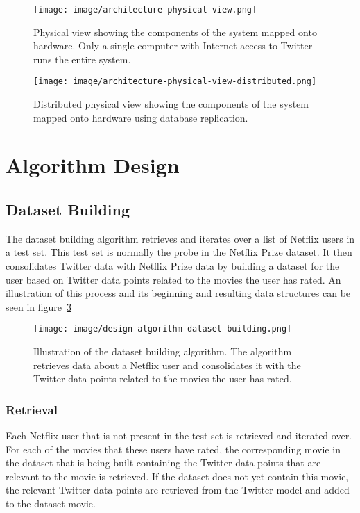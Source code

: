 \begin{figure}[H]
\centerline{\texttt{[image: image/architecture-physical-view.png]}}
\caption[Physical view]{Physical view showing the components of the system mapped onto hardware. Only a single computer with Internet access to Twitter runs the entire system.}
\label{figure:physical-view}
\end{figure}

\begin{figure}[H]
\centerline{\texttt{[image: image/architecture-physical-view-distributed.png]}}
\caption[Distributed physical view]{Distributed physical view showing the components of the system mapped onto hardware using database replication.}
\label{figure:distr-phys-view}
\end{figure}

\section{Algorithm Design}
\subsection{Dataset Building}\label{algorithm-design:dataset-building}
The dataset building algorithm retrieves and iterates over a list of Netflix users in a test set. This test set is normally the probe in the Netflix Prize dataset. It then consolidates Twitter data with Netflix Prize data by building a dataset for the user based on Twitter data points related to the movies the user has rated. An illustration of this process and its beginning and resulting data structures can be seen in figure~\ref{figure:dataset-building-algorithm}

\begin{figure}[H]
    \centerline{\texttt{[image: image/design-algorithm-dataset-building.png]}}
    \caption[Database building algorithm]{Illustration of the dataset building algorithm. The algorithm retrieves data about a Netflix user and consolidates it with the Twitter data points related to the movies the user has rated.}
    \label{figure:dataset-building-algorithm}
\end{figure}


\subsubsection{Retrieval}
    Each Netflix user that is not present in the test set is retrieved and iterated over.
    For each of the movies that these users have rated, the corresponding movie in the dataset that is being built containing the Twitter data points that are relevant to the movie is retrieved.
    If the dataset does not yet contain this movie, the relevant Twitter data points are retrieved from the Twitter model and added to the dataset movie.


